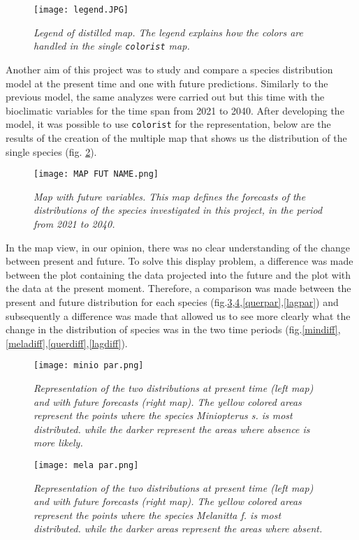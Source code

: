 \documentclass[12pt,a4paper]{article}
\begin{document}
\begin{figure}[H]
\centerline{\texttt{[image: legend.JPG]}}
\caption{\textit{Legend of distilled map. The legend explains how the colors are handled in the single \texttt{colorist} map.}}
\label{legend}
\end{figure}
\vspace{1cm}
Another aim of this project was to study and compare a species distribution model at the present time and one with future predictions.
Similarly to the previous model, the same analyzes were carried out but this time with the bioclimatic variables for the time span from 2021 to 2040.
After developing the model, it was possible to use \texttt{colorist} for the representation, below are the results of the creation of the multiple map that shows us the distribution of the single species (fig. \ref{fut}).
\vspace{1cm}
\begin{figure}[H]
\centerline{\texttt{[image: MAP FUT NAME.png]}}
\caption{\textit{Map with future variables. This map defines the forecasts of the distributions of the species investigated in this project, in the period from 2021 to 2040.}}
\label{fut}
\end{figure}


In the map view, in our opinion, there was no clear understanding of the change between present and future.
To solve this display problem, a difference was made between the plot containing the data projected into the future and the plot with the data at the present moment.
Therefore, a comparison was made between the present and future distribution for each species (fig.\ref{miniopar},\ref{melapar},\ref{querpar},\ref{lagpar}) and subsequently a difference was made that allowed us to see more clearly what the change in the distribution of species was in the two time periods (fig.\ref{mindiff},\ref{meladiff},\ref{querdiff},\ref{lagdiff}).
\begin{figure}[H]
\centerline{\texttt{[image: minio par.png]}}
\caption{\textit{Representation of the two distributions at present time (left map) and with future forecasts (right map).
The yellow colored areas represent the points where the species Miniopterus s. is most distributed. while the darker represent the areas where absence is more likely.}}
\label{miniopar}
\end{figure}

\begin{figure}[H]
\centerline{\texttt{[image: mela par.png]}}
\caption{\textit{Representation of the two distributions at present time (left map) and with future forecasts (right map).
The yellow colored areas represent the points where the species Melanitta f. is most distributed. while the darker areas represent the areas where absent.}}
\label{melapar}
\end{figure}
\end{document}
